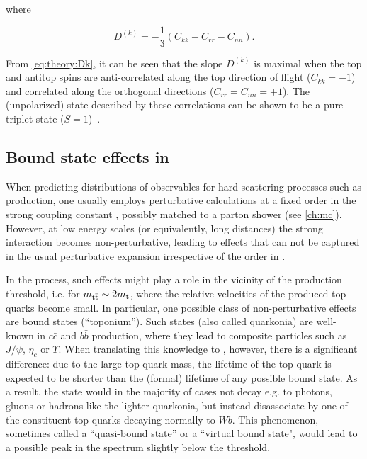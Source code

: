 \noindent where~\cite{Maltoni:2024tul}

\begin{equation}
\label{eq:theory:Dk}
    D^{(k)} = - \frac{1}{3} \left( C_{kk} - C_{rr} - C_{nn} \right) .
\end{equation}

From \cref{eq:theory:Dk}, it can be seen that the slope $D^{(k)}$ is maximal when the top and antitop spins are anti-correlated along the top direction of flight ($C_{kk} = -1$) and correlated along the orthogonal directions ($C_{rr} = C_{nn} = +1$). The (unpolarized) state described by these correlations can be shown to be a pure triplet state ($S=1$)~\cite{Maltoni:2024tul}.



\subsection{Bound state effects in \ttbartitle}
\label{sec:theory:etat}

When predicting distributions of observables for hard scattering processes such as \ttbar production, one usually employs perturbative calculations at a fixed order in the strong coupling constant \alphas, possibly matched to a parton shower (see \cref{ch:mc}). However, at low energy scales (or equivalently, long distances) the strong interaction becomes non-perturbative, leading to effects that can not be captured in the usual perturbative expansion irrespective of the order in \alphas.

In the \pptt process, such effects might play a role in the vicinity of the \ttbar production threshold, i.e. for $m_{\mathrm{t \bar{t}}} \sim 2 m_{\mathrm{t}}$, where the relative velocities of the produced top quarks become small. In particular, one possible class of non-perturbative effects are \ttbar bound states (``toponium''). Such states (also called quarkonia) are well-known in $c \bar{c}$ and $b \bar{b}$ production, where they lead to composite particles such as $J/\psi$, $\eta_c$ or $\Upsilon$. When translating this knowledge to \ttbar, however, there is a significant difference: due to the large top quark mass, the lifetime of the top quark is expected to be shorter than the (formal) lifetime of any possible \ttbar bound state. As a result, the state would in the majority of cases not decay e.g. to photons, gluons or hadrons like the lighter quarkonia, but instead disassociate by one of the constituent top quarks decaying normally to $W b$. This phenomenon, sometimes called a ``quasi-bound state'' or a ``virtual bound state", would lead to a possible peak in the \mWWbb spectrum slightly below the \ttbar threshold.

